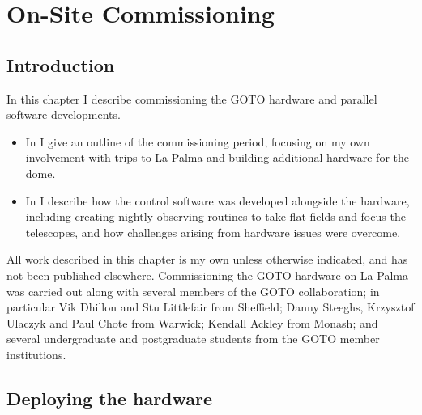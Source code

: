 
\chapter{On-Site Commissioning}
\label{chap:commissioning}


\chaptoc{}


\section{Introduction}
\label{sec:commissioning_intro}


\begin{colsection}

In this chapter I describe commissioning the GOTO hardware and parallel software developments.
%
\begin{itemize}
    \item In  I give an outline of the commissioning period, focusing on my own involvement with trips to La Palma and building additional hardware for the dome.
    \item In  I describe how the control software was developed alongside the hardware, including creating nightly observing routines to take flat fields and focus the telescopes, and how challenges arising from hardware issues were overcome.
\end{itemize}
%
All work described in this chapter is my own unless otherwise indicated, and has not been published elsewhere. Commissioning the GOTO hardware on La Palma was carried out along with several members of the GOTO collaboration; in particular Vik Dhillon and Stu Littlefair from Sheffield; Danny Steeghs, Krzysztof Ulaczyk and Paul Chote from Warwick; Kendall Ackley from Monash; and several undergraduate and postgraduate students from the GOTO member institutions.

\end{colsection}


\section{Deploying the hardware}
\label{sec:hardware_commissioning}

